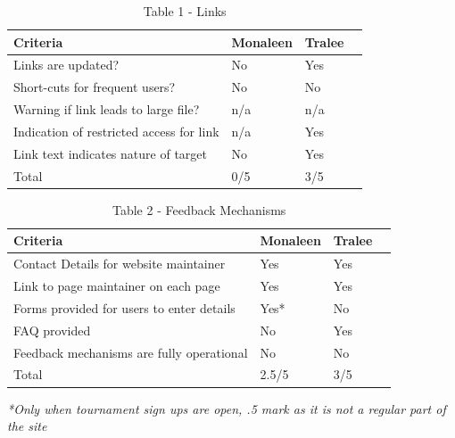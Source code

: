 \begin{table}[H]
\caption{Table 1 - Links}
\begin{center}
    \begin{tabular}{ | l | l | l | p{5cm} |}
    \hline
	\textbf{Criteria} & \textbf{Monaleen} & \textbf{Tralee}\\ \hline
	Links are updated? & No & Yes\\ \hline
	Short-cuts for frequent users? & No & No\\ \hline
	Warning if link leads to large file? & n/a & n/a\\ \hline
	Indication of restricted access for link & n/a & Yes\\ \hline
	Link text indicates nature of target & No & Yes\\ \hline
	Total & 0/5 & 3/5\\ \hline	
    \end{tabular}
\end{center}
\label{fig:table1}
\end{table}

\begin{table}[H]
\caption{Table 2 - Feedback Mechanisms}
\begin{center}
    \begin{tabular}{ | l | l | l | p{5cm} |}
    \hline
	\textbf{Criteria} & \textbf{Monaleen} & \textbf{Tralee}\\ \hline
	Contact Details for website maintainer & Yes & Yes\\ \hline
	Link to page maintainer on each page & Yes & Yes\\ \hline
	Forms provided for users to enter details & Yes* & No\\ \hline
	FAQ provided & No & Yes\\ \hline
	Feedback mechanisms are fully operational & No & No\\ \hline
	Total & 2.5/5 & 3/5\\ \hline	
    \end{tabular}
\end{center}
\label{fig:table2}
\end{table}
\textit{*Only when tournament sign ups are open, .5 mark as it is not a regular part of the site}

